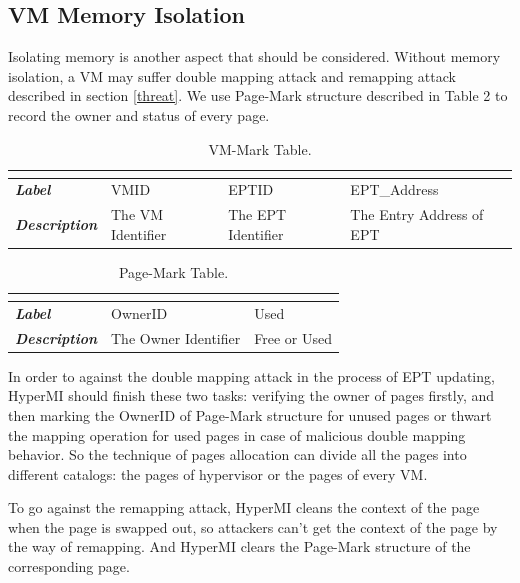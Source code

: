 \documentclass[conference]{IEEEtran}
\begin{document}
\subsection{VM Memory Isolation}

Isolating memory is another aspect that should be considered.
Without memory isolation, a VM may suffer double mapping attack and remapping attack described in section \ref{threat}. We use Page-Mark structure described in Table 2 to record the owner and status of every page. 

\begin{table}[htbp]
\centering
\caption{VM-Mark Table.}\label{tab1}
\begin{tabular}{p{1.4cm}|p{1.2cm}|p{1.1cm}|p{1.7cm}}
\hline
\multicolumn{4}{c}{\bfseries\textbf\centering{VM-Mark Table}}\\
\hline
{\itshape\bfseries Label} & VMID & EPTID & EPT\_Address\\
\hline
{\itshape\bfseries Description} & { The VM Identifier} & The EPT Identifier & The Entry Address of EPT\\
\hline
\end{tabular}
\end{table}

\begin{table}
\centering
\caption{Page-Mark Table.}\label{tab2}
\begin{tabular}{p{1.2cm}|p{1.4cm}|p{1.5cm}}
\hline
\multicolumn{3}{c}{\bfseries\textbf\centering{Page-Mark Table}}\\
\hline
{\itshape\bfseries Label} & OwnerID & Used \\
\hline
{\itshape\bfseries Description} & The Owner Identifier & Free or Used \\
\hline
\end{tabular}
\end{table}
In order to against the double mapping attack in the process of EPT updating, HyperMI should finish these two tasks: verifying the owner of pages firstly, and then marking the OwnerID of Page-Mark structure for unused pages or thwart the mapping operation for used pages in case of malicious double mapping behavior. So the technique of pages allocation can divide all the pages into different catalogs: the pages of hypervisor or the pages of every VM.

To go against the remapping attack, HyperMI cleans the context of the page when the page is swapped out, so attackers can't get the context of the page by the way of remapping. And HyperMI clears the Page-Mark structure of the corresponding page. 
\end{document}
